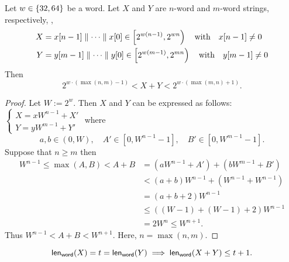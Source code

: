 \begin{tcolorbox}[colframe=procolor,title={\color{white}\bf Upper and Lower Bound of Addition}]
\begin{proposition}
	Let $w\in\set{32,64}$ be a word. Let $X$ and $Y$ are \(n\)-word and \(m\)-word strings, respectively, \ie, 
	\begin{align*}
		X &= x[n-1]\adjacent\cdots\adjacent x[0]\in\intco{2^{w(n-1)},2^{wn}}\quad\text{with}\quad x[n-1]\neq 0\\
		Y &= y[m-1]\adjacent\cdots\adjacent y[0]\in\intco{2^{w(m-1)},2^{mn}}\quad\text{with}\quad y[m-1]\neq 0\\
	\end{align*} Then \[
	{2}^{w\cdot(\max(n,m)-1)}<X+Y<2^{w\cdot(\max(m,n)+1)}.
	\]
\end{proposition}
\end{tcolorbox}
\begin{proof}
	Let $W:=2^w$. Then $X$ and $Y$ can be expressed as follows: 
	$\begin{cases}
		X=xW^{n-1}+X'\\
		Y=yW^{m-1}+Y'
	\end{cases}$ where \[
	a,b\in(0,W),\quad A'\in[0,W^{n-1}-1],\quad B'\in[0,W^{m-1}-1].
	\]
	Suppose that \(n\geq m\) then \begin{align*}
		W^{n-1}\leq\max(A,B)<A+B
		&=(aW^{n-1}+A')+(bW^{m-1}+B')\\
		&<(a+b)W^{n-1}+(W^{n-1}+W^{n-1})\\
		&=(a+b+2)W^{n-1}\\
		&\leq((W-1)+(W-1)+2)W^{n-1}\\
		&=2W^n\leq W^{n+1}.
	\end{align*} Thus $
	W^{n-1}<A+B<W^{n+1}.
	$ Here, \(n=\max(n,m)\).
\end{proof}

\begin{tcolorbox}[colframe=corcolor,title={\color{white}\bf }]
	\begin{corollary}
		\[
		\mathsf{len}_{\mathsf{word}}(X)=t=\mathsf{len}_{\mathsf{word}}(Y)\implies\mathsf{len}_{\mathsf{word}}(X+Y)\leq t+1.
		\]
	\end{corollary}
\end{tcolorbox}

